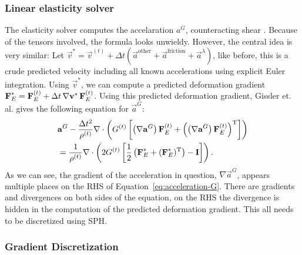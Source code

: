 \subsubsection*{Linear elasticity solver}
The elasticity solver computes the accelaration $a^G$, counteracting shear \cite{icsph}.
Because of the tensors involved, the formula looks unwieldy.
However, the central idea is very similar:
Let 
$\vec v^* = \vec v^{(t)} + \Delta t (\vec a^{\text{other}} + \vec a^{\text{friction}} + \vec a^\lambda)$,
like before, this is a crude predicted velocity including all known
accelerations using explicit Euler integration.
Using $\vec v^*$, we can compute a
predicted deformation gradient $\Mat F^*_E = \Mat F^{(t)}_E + \Delta t\, \nabla \Vec v^* \,
\Mat F^{(t)}_E$.
Using this predicted deformation gradient, Gissler et. al. gives
the following equation for $\vec a^G$:
\begin{equation}
    \label{eq:acceleration-G}
\begin{split}
    & \mathbf{a}^G - \frac {\Delta t^2} {\rho^{(t)}}
        \nabla \cdot \left(
            G^{(t)} \left[
                \left(
                    \nabla \mathbf{a}^G
                \right) \bm{\mathrm F}^{(t)}_E
                + \left(
                        \left(\nabla \mathbf{a}^G\right) \bm{\mathrm F}^{(t)}_E 
                \right)^\mathrm T
            \right]
        \right) \\
        & = \frac 1 {\rho^{(t)}} \nabla \cdot \left(
            2 G^{(t)} \left[
                \frac 1 2 \left(
                    \bm{\mathrm F}^*_E + (\bm{\mathrm F}^{*}_E)^\mathrm T
                \right) - \bm{\mathrm I}
            \right]
        \right)
        \text.
\end{split}
\end{equation}
As we can see, the gradient of the acceleration in question, $\nabla \vec a^G$, appears 
multiple places on the RHS of Equation~\ref{eq:acceleration-G}.
There are gradients and divergences on both sides of the equation,
on the RHS the divergence is hidden in the computation of the
predicted deformation gradient.
This all needs to be discretized using SPH.

\subsubsection*{Gradient Discretization}

